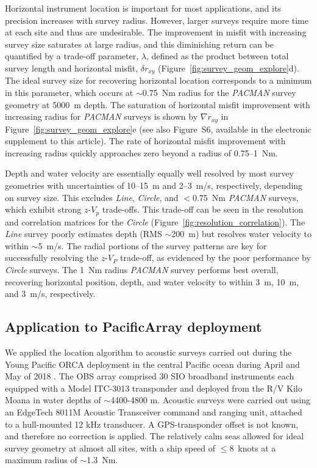 Horizontal instrument location is important for most applications, and its precision increases with survey radius. However, larger surveys require more time at each site and thus are undesirable. The improvement in misfit with increasing survey size saturates at large radius, and this diminishing return can be quantified by a trade-off parameter, $\lambda$, defined as the product between total survey length and horizontal misfit, $\delta r_{xy}$ (Figure~\ref{fig:survey_geom_explore}d). The ideal survey size for recovering horizontal location corresponds to a minimum in this parameter, which occurs at $\sim$0.75~Nm radius for the \textit{PACMAN} survey geometry at 5000~m depth. The saturation of horizontal misfit improvement with increasing radius for \textit{PACMAN} surveys is shown by $\nabla r_{xy}$ in Figure~\ref{fig:survey_geom_explore}e (see also Figure~S6, available in the electronic supplement to this article). The rate of horizontal misfit improvement with increasing radius quickly approaches zero beyond a radius of 0.75--1~Nm.

Depth and water velocity are essentially equally well resolved by most survey geometries with uncertainties of 10--15~m and 2--3~m/s, respectively, depending on survey size. This excludes \textit{Line}, \textit{Circle}, and $<$0.75~Nm \textit{PACMAN} surveys, which exhibit strong $z$-$V_p$ trade-offs. This trade-off can be seen in the resolution and correlation matrices for the \textit{Circle} (Figure~\ref{fig:resolution_correlation}). The \textit{Line} survey poorly estimates depth (RMS $\sim$200~m) but resolves water velocity to within $\sim$5~m/s. The radial portions of the survey patterns are key for successfully resolving the $z$-$V_P$ trade-off, as evidenced by the poor performance by \textit{Circle} surveys. The 1~Nm radius \textit{PACMAN} survey performs best overall, recovering horizontal position, depth, and water velocity to within 3~m, 10~m, and 3~m/s, respectively.


\subsection{Application to PacificArray deployment} \label{sec:PacificArray_deployment}
We applied the location algorithm to acoustic surveys carried out during the Young Pacific ORCA deployment in the central Pacific ocean during April and May of 2018 \citep{Gaherty2018}. The OBS array comprised 30 SIO broadband instruments each equipped with a Model ITC-3013 transponder and deployed from the R/V Kilo Moana in water depths of $\sim$4400-4800 m. Acoustic  surveys were carried out using an EdgeTech 8011M Acoustic Transceiver command and ranging unit, attached to a hull-mounted 12 kHz transducer. A GPS-transponder offset is not known, and therefore no correction is applied. The relatively calm seas allowed for ideal survey geometry at almost all sites, with a ship speed of \mbox{$\le$8~knots} at a maximum radius of \mbox{$\sim$1.3~Nm}. 

